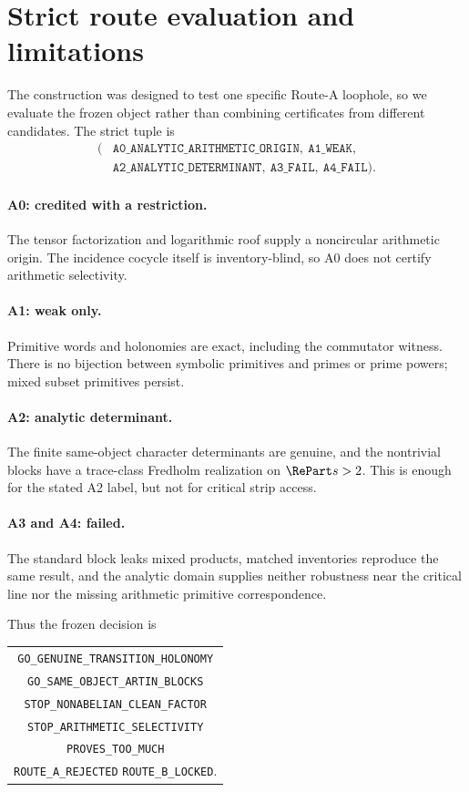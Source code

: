 \section{Strict route evaluation and limitations}
\label{sec:route}

The construction was designed to test one specific Route-A loophole, so we
evaluate the frozen object rather than combining certificates from different
candidates.  The strict tuple is
\[
\begin{split}
(&\texttt{A0\_ANALYTIC\_ARITHMETIC\_ORIGIN},\
  \texttt{A1\_WEAK},\\
 &\texttt{A2\_ANALYTIC\_DETERMINANT},\
  \texttt{A3\_FAIL},\
  \texttt{A4\_FAIL}).
\end{split}
\tag{9.1}
\]

\paragraph{A0: credited with a restriction.}
The tensor factorization and logarithmic roof supply a noncircular
arithmetic origin.  The incidence cocycle itself is inventory-blind, so A0
does not certify arithmetic selectivity.

\paragraph{A1: weak only.}
Primitive words and holonomies are exact, including the commutator witness.
There is no bijection between symbolic primitives and primes or prime
powers; mixed subset primitives persist.

\paragraph{A2: analytic determinant.}
The finite same-object character determinants are genuine, and the
nontrivial blocks have a trace-class Fredholm realization on
$\RePart s>2$.  This is enough for the stated A2 label, but not for critical
strip access.

\paragraph{A3 and A4: failed.}
The standard block leaks mixed products, matched inventories reproduce the
same result, and the analytic domain supplies neither robustness near the
critical line nor the missing arithmetic primitive correspondence.

Thus the frozen decision is
\begin{center}
\begin{tabular}{c}
\texttt{GO\_GENUINE\_TRANSITION\_HOLONOMY}\\
\texttt{GO\_SAME\_OBJECT\_ARTIN\_BLOCKS}\\
\texttt{STOP\_NONABELIAN\_CLEAN\_FACTOR}\\
\texttt{STOP\_ARITHMETIC\_SELECTIVITY}\\
\texttt{PROVES\_TOO\_MUCH}\\
\texttt{ROUTE\_A\_REJECTED}\qquad
\texttt{ROUTE\_B\_LOCKED}.
\end{tabular}
\end{center}

